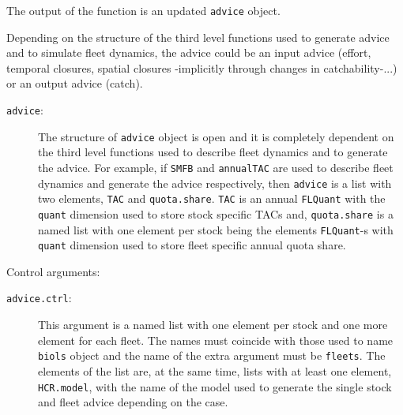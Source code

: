 	The output of the function is an updated \texttt{advice} object.
	
	Depending on the structure of the third level functions used to generate advice and to simulate fleet dynamics, the
	advice could be an input advice (effort, temporal closures, spatial closures -implicitly through changes in catchability-...)
	or an output advice (catch).  

\begin{description}
  \item[\texttt{advice}:] The structure of \texttt{advice} object is open and it is completely dependent on the
  third level functions used to describe fleet dynamics and to generate the advice. For example, if \texttt{SMFB}
	and \texttt{annualTAC} are used to describe fleet dynamics and generate the advice respectively, then \texttt{advice}
	is a list with two elements, \texttt{TAC} and \texttt{quota.share}. \texttt{TAC} is an annual \texttt{FLQuant} 
	with the \texttt{quant} dimension used to store stock specific TACs and, \texttt{quota.share} is a named list with one
	element per stock being the elements \texttt{FLQuant}-s with  \texttt{quant} dimension used to 
	store fleet specific annual quota share.
\end{description}

\noindent Control arguments:
\begin{description}
  \item[\texttt{advice.ctrl}:] This argument is a named list with one element per stock and one more element for each fleet.
  The names must coincide with those used to name \texttt{biols} object and the name of the extra argument must be \texttt{fleets}.
	The elements of the list are, at the same time, lists with at least one element, \texttt{HCR.model}, with the name of the model used to 
	generate the single stock and fleet advice depending on the case.     
\end{description}
